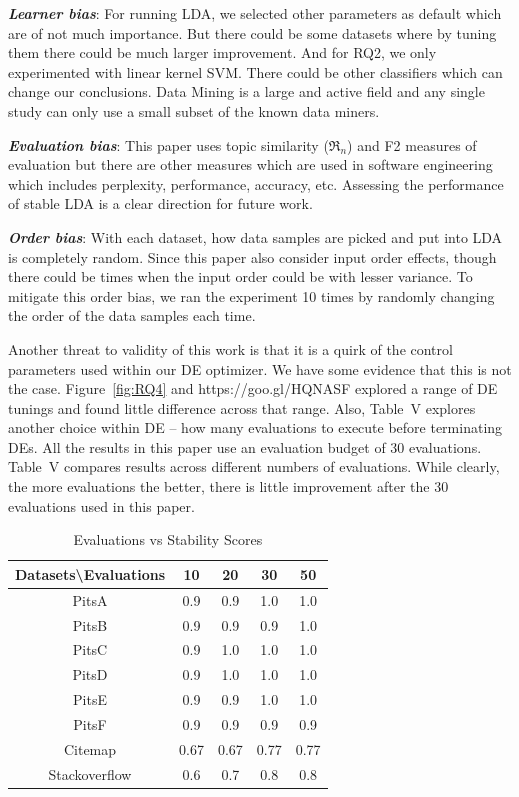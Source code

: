 \documentclass[twocolumn,5p,sort&compress]{elsarticle}
\theoremstyle{break}
\begin{document}
\textbf{\textit{Learner bias}}: For running LDA, we selected other parameters as default which are of not much importance. But there could be some datasets where by tuning them there could be much larger improvement. And for RQ2, we only experimented with linear kernel SVM. There could be other classifiers which can change our conclusions. Data Mining is a large and active field and any single study can only use a small subset of the known data miners.

\textbf{\textit{Evaluation bias}}: This paper uses topic similarity ($\Re_n$) and F2 measures of evaluation but there are other measures which are used in software engineering which
includes perplexity, performance, accuracy, etc. Assessing
the performance of stable LDA is a clear direction for future work.

\textbf{\textit{Order bias}}: With each dataset, how data samples are picked and put into LDA is completely random. Since this paper also consider input order effects, though there could be times when the input order could be with lesser variance. To mitigate this order bias, we ran the experiment 10 times by randomly changing the order of the data samples each time.


Another threat to validity of this work is that it is a quirk of the control
parameters used within our DE optimizer.
We have some evidence that this is not the case.
Figure~\ref{fig:RQ4} and https://goo.gl/HQNASF explored a range of DE tunings and found
little difference across that range. Also, Table~V explores another choice within DE -- how
many evaluations to execute before terminating DEs. All the results in this paper use an
evaluation budget of 30 evaluations. Table~V
compares results across different numbers of evaluations. While clearly,
the more evaluations the better, there is little improvement after the
30 evaluations used in this paper.

\begin{table}[!htbp]
\scriptsize
\begin{center}
\begin{tabular}{|c|c|c|c|c|}
\hline 
\textbf{Datasets\textbackslash Evaluations} & \textbf{10} & \textbf{20} & \textbf{30} &
\textbf{50} \\[0.5ex]
\hline
PitsA & 0.9 & 0.9 & 1.0 & 1.0\\ 
\hline
PitsB & 0.9 & 0.9 & 0.9 & 1.0 \\
\hline
PitsC & 0.9 & 1.0 & 1.0 & 1.0\\ 
\hline
PitsD & 0.9 & 1.0 & 1.0 & 1.0\\ 
\hline
PitsE & 0.9 & 0.9 & 1.0 & 1.0\\
\hline
PitsF & 0.9 & 0.9 & 0.9 & 0.9\\
\hline
Citemap & 0.67 & 0.67 & 0.77 & 0.77\\
\hline
Stackoverflow & 0.6 & 0.7 & 0.8 & 0.8\\
\hline
\end{tabular}
\end{center}
\caption{Evaluations vs Stability Scores}
\label{tb:tablename1}
\end{table}
\end{document}

